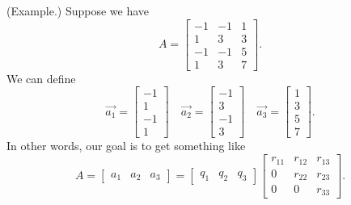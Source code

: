 \documentclass[letterpaper]{article}
\newcommand{\0}{\mathbf{0}}
\begin{document}
\begin{mdframed}
    (Example.) Suppose we have \[A = \begin{bmatrix}
        -1 & -1 & 1 \\ 
        1 & 3 & 3 \\ 
        -1 & -1 & 5 \\ 
        1 & 3 & 7
    \end{bmatrix}.\]
    We can define 
    \[\vec{a_1} = \begin{bmatrix}
        -1 \\ 1 \\ -1 \\ 1
    \end{bmatrix} \quad \vec{a_2} = \begin{bmatrix}
        -1 \\ 3 \\ -1 \\ 3
    \end{bmatrix} \quad \vec{a_3} = \begin{bmatrix}
        1 \\ 3 \\ 5 \\ 7
    \end{bmatrix}.\]
    In other words, our goal is to get something like 
    \[A = \begin{bmatrix}
        a_1 & a_2 & a_3
    \end{bmatrix} = \begin{bmatrix}
        q_1 & q_2 & q_3
    \end{bmatrix} \begin{bmatrix}
        r_{11} & r_{12} & r_{13} \\ 
        0 & r_{22} & r_{23} \\ 
        0 & 0 & r_{33}
    \end{bmatrix}.\]
\end{mdframed}
\end{document}
